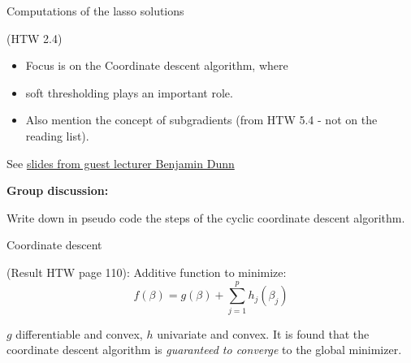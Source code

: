 \documentclass[
  ignorenonframetext,
]{beamer}
\providecommand{\tightlist}{%
  \setlength{\itemsep}{0pt}\setlength{\parskip}{0pt}}
\begin{document}
\begin{frame}

\begin{block}{Computations of the lasso solutions}

(HTW 2.4)

\begin{itemize}
\tightlist
\item
  Focus is on the Coordinate descent algorithm, where
\item
  soft thresholding plays an important role.
\item
  Also mention the concept of subgradients (from HTW 5.4 - not on the
  reading list).
\end{itemize}

See \href{slides\%20link}{slides from guest lecturer Benjamin Dunn}

\end{block}

\end{frame}

\begin{frame}

\textbf{Group discussion:}

Write down in pseudo code the steps of the cyclic coordinate descent
algorithm.

\end{frame}

\begin{frame}

\end{frame}

\begin{frame}

\begin{block}{Coordinate descent}

(Result HTW page 110): Additive function to minimize:
\[ f(\beta)=g(\beta)+\sum_{j=1}^p h_j(\beta_j)\]

\(g\) differentiable and convex, \(h\) univariate and convex. It is
found that the coordinate descent algorithm is \emph{guaranteed to
converge} to the global minimizer.

\end{block}

\end{frame}
\end{document}
